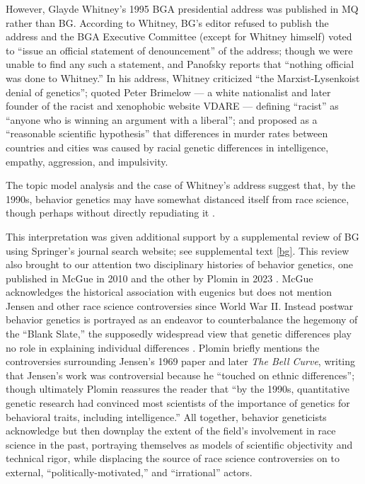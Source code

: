 \documentclass[12pt]{article}
\begin{document}
However, Glayde Whitney's 1995 BGA presidential address was published in MQ rather than BG. According to Whitney, BG's editor refused to publish the address and the BGA Executive Committee (except for Whitney himself) voted to ``issue an official statement of denouncement'' of the address; though we were unable to find any such a statement, and Panofsky reports that ``nothing official was done to Whitney.'' In his address, Whitney criticized ``the Marxist-Lysenkoist denial of genetics''; quoted Peter Brimelow --- a white nationalist and later founder of the racist and xenophobic website VDARE --- defining ``racist'' as ``anyone who is winning an argument with a liberal''; and proposed as a ``reasonable scientific hypothesis'' that differences in murder rates between countries and cities was caused by racial genetic differences in intelligence, empathy, aggression, and impulsivity.

The topic model analysis and the case of Whitney's address suggest that, by the 1990s, behavior genetics may have somewhat distanced itself from race science, though perhaps without directly repudiating it \cite{GillbornSoftlySoftlyGenetics2016, HennWhyDNANo2021}.

This interpretation was given additional support by a supplemental review of BG using Springer's journal search website; see supplemental text \ref{bg}. This review also brought to our attention two disciplinary histories of behavior genetics, one published in McGue in 2010 \cite{McGueEndBehavioralGenetics2010} and the other by Plomin in 2023 \cite{PlominCelebratingCenturyResearch2023}. McGue acknowledges the historical association with eugenics but does not mention Jensen and other race science controversies since World War II. Instead postwar behavior genetics is portrayed as an endeavor to counterbalance the hegemony of the ``Blank Slate,'' the supposedly widespread view that genetic differences play no role in explaining individual differences \cite{BatesonCorpseWearisomeDebate2002}. Plomin briefly mentions the controversies surrounding Jensen's 1969 paper and later \emph{The Bell Curve}, writing that Jensen's work was controversial because he ``touched on ethnic differences''; though ultimately Plomin reassures the reader that ``by the 1990s, quantitative genetic research had convinced most scientists of the importance of genetics for behavioral traits, including intelligence.'' All together, behavior geneticists acknowledge but then downplay the extent of the field's involvement in race science in the past, portraying themselves as models of scientific objectivity and technical rigor, while displacing the source of race science controversies on to external, ``politically-motivated,'' and ``irrational'' actors.
\end{document}
